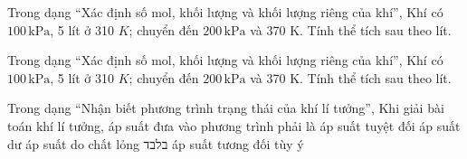 \begin{bt}
Trong dạng “Xác định số mol, khối lượng và khối lượng riêng của khí”, Khí có $100\,\text{kPa}$, 5 lít ở 310 $K$; chuyển đến $200\,\text{kPa}$ và 370 K. Tính thể tích sau theo lít.
\end{bt}

\begin{ex}
Trong dạng “Xác định số mol, khối lượng và khối lượng riêng của khí”, Khí có $100\,\text{kPa}$, 5 lít ở 310 $K$; chuyển đến $200\,\text{kPa}$ và 370 K. Tính thể tích sau theo lít.
\end{ex}

\begin{ex}
Trong dạng “Nhận biết phương trình trạng thái của khí lí tưởng”, Khi giải bài toán khí lí tưởng, áp suất đưa vào phương trình phải là
\choice
{\True áp suất tuyệt đối}
{áp suất dư}
{áp suất do chất lỏng בלבד}
{áp suất tương đối tùy ý}
\end{ex}

